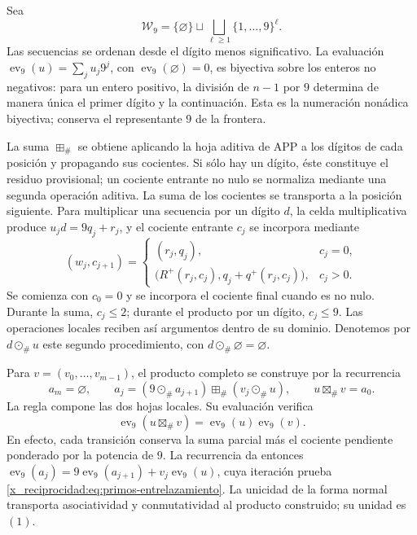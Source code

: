 Sea
\[
 \mathcal W_9=\{\varnothing\}\sqcup
 \bigsqcup_{\ell\geq1}\{1,\ldots,9\}^{\ell}.
\]
Las secuencias se ordenan desde el dígito menos significativo. La evaluación
\(\operatorname{ev}_9(u)=\sum_j u_j9^j\), con
\(\operatorname{ev}_9(\varnothing)=0\), es biyectiva sobre los enteros no
negativos: para un entero positivo, la división de \(n-1\) por \(9\)
determina de manera única el primer dígito y la continuación. Esta es la
numeración nonádica biyectiva; conserva el representante \(9\) de la
frontera.

La suma \(\boxplus_\#\) se obtiene aplicando la hoja aditiva de APP a los
dígitos de cada posición y propagando sus cocientes. Si sólo hay un dígito,
éste constituye el residuo provisional; un cociente entrante no nulo se
normaliza mediante una segunda operación aditiva. La suma de los
cocientes se transporta a la posición siguiente. Para multiplicar una
secuencia por un dígito \(d\), la celda multiplicativa produce
\(u_jd=9q_j+r_j\), y el cociente entrante \(c_j\) se incorpora mediante
\[
 (w_j,c_{j+1})=
 \begin{cases}
 (r_j,q_j),&c_j=0,\\
 \bigl(R^+(r_j,c_j),q_j+q^+(r_j,c_j)\bigr),&c_j>0.
 \end{cases}
\]
Se comienza con \(c_0=0\) y se incorpora el cociente final cuando es no
nulo. Durante la suma, \(c_j\leq2\); durante el producto por un dígito,
\(c_j\leq9\). Las operaciones locales reciben así argumentos dentro
de su dominio. Denotemos por \(d\odot_\#u\) este segundo procedimiento,
con \(d\odot_\#\varnothing=\varnothing\).

Para \(v=(v_0,\ldots,v_{m-1})\), el producto completo se construye por
la recurrencia
\[
 a_m=\varnothing,\qquad
 a_j=(9\odot_\#a_{j+1})\boxplus_\#(v_j\odot_\#u),
 \qquad u\boxtimes_\#v=a_0.
\]
La regla compone las dos hojas locales. Su evaluación verifica
\begin{equation}
 \operatorname{ev}_9(u\boxtimes_\#v)
   =\operatorname{ev}_9(u)\operatorname{ev}_9(v).
 \label{x_reciprocidad:eq:primos-entrelazamiento}
\end{equation}
En efecto, cada transición conserva la suma parcial más el cociente
pendiente ponderado por la potencia de \(9\). La recurrencia da entonces
\(\operatorname{ev}_9(a_j)=9\operatorname{ev}_9(a_{j+1})+
v_j\operatorname{ev}_9(u)\), cuya iteración prueba
\eqref{x_reciprocidad:eq:primos-entrelazamiento}. La unicidad de la forma normal transporta
asociatividad y conmutatividad al producto construido; su unidad es \((1)\).

